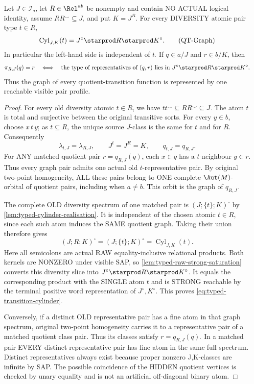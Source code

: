 \begin{lemma}
\label{lem:typed-transition-cylinder}
Let \(J\in\mathcal I_a\), let \(R\in\Rel^{ab}\)
be nonempty and contain NO ACTUAL logical identity,
assume \(RR^{\smile}\subseteq J\), and put \(K=J^R\).
For every DIVERSITY atomic pair type
\(t\in R\),
\[
 \operatorname{Cyl}_{J,K}(t)
   =J^\circ\starprod R\starprod K^\circ.
\tag{QT-Graph}\label{eq:typed-transition-cylinder}
\]
In particular the left-hand side is independent of \(t\).  If
\(q\in a/J\) and \(r\in b/K\), then
\[
 \pi_{R,J}(q)=r
 \quad\Longleftrightarrow\quad
 \text{the type of representatives of \((q,r)\) lies in
 \(J^\circ\starprod R\starprod K^\circ\)}.
\]
Thus the graph of every quotient-transition function is represented by one
reachable visible pair profile.
\end{lemma}

\begin{proof}
For every old diversity atomic $t\in R$,
we have $tt^\smile\subseteq RR^\smile
\subseteq J$. The atom $t$ is total and
surjective between the original transitive
sorts. For every $y\in b$, choose
$x\,t\,y$; as $t\subseteq R$, the unique
source $J$-class is the same for $t$ and
for $R$. Consequently
\[
 \lambda_{t,J}=\lambda_{R,J},
 \qquad J^t=J^R=K,\qquad
 q_{t,J}=q_{R,J}.
\]
For ANY matched quotient pair
$r=q_{R,J}(q)$, each $x\in q$ has a
$t$-neighbour $y\in r$. Thus every
graph pair admits one actual old
$t$-representative pair. By original
two-point homogeneity, ALL these pairs
belong to ONE complete $\Aut(M)$-orbital
of quotient pairs, including when $a\ne b$.
This orbit is the graph of $q_{R,J}$.

The complete OLD diversity spectrum of
one matched pair is
$(J;\{t\};K)^\circ$ by
\cref{lem:typed-cylinder-realisation}.
It is independent of the chosen atomic
$t\in R$, since each such atom induces
the SAME quotient graph. Taking their
union therefore gives
\[
 (J;R;K)^\circ
   =(J;\{t\};K)^\circ
   =\operatorname{Cyl}_{J,K}(t).
\]
Here all semicolons are actual RAW
equality-inclusive relational products.
Both kernels are NONZERO under visible
SAP, so \cref{lem:typed-raw-strong-saturation}
converts this diversity slice into
$J^\circ\starprod R\starprod K^\circ$.
It equals the corresponding product
with the SINGLE atom $t$ and is
STRONG reachable by the terminal
positive word representation of
$J^\circ,K^\circ$. This proves
\eqref{eq:typed-transition-cylinder}.

Conversely, if a distinct OLD
representative pair has a fine atom
in that graph spectrum, original
two-point homogeneity carries it
to a representative pair of a matched
quotient class pair. Thus its classes
satisfy $r=q_{R,J}(q)$. In a matched
pair EVERY distinct representative
pair has fine atom in the same full
spectrum. Distinct representatives
always exist because proper nonzero
J,K-classes are infinite by SAP.
The possible coincidence of the
HIDDEN quotient vertices is checked
by unary equality and is not an
artificial off-diagonal binary atom.
\end{proof}

